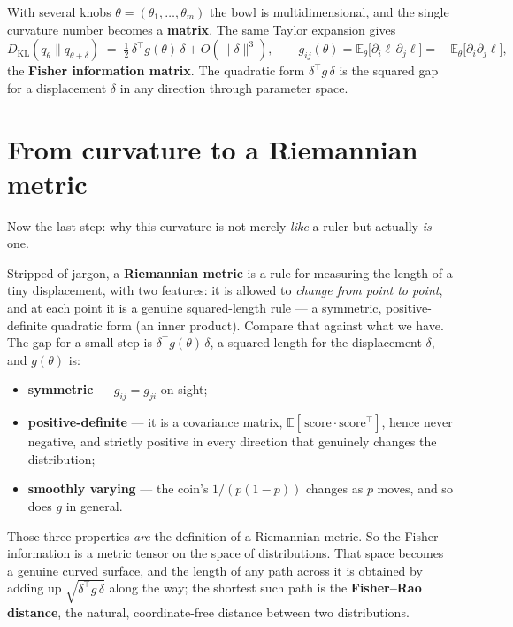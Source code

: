 \documentclass[11pt]{article}
\begin{document}
With several knobs $\theta = (\theta_1, \dots, \theta_m)$ the bowl is multidimensional, and the
single curvature number becomes a \textbf{matrix}. The same Taylor expansion gives
\[
  D_{\mathrm{KL}}(q_\theta \| q_{\theta+\delta}) \;=\; \tfrac12\,\delta^{\top} g(\theta)\,\delta + O(\|\delta\|^3),
  \qquad
  g_{ij}(\theta) = \mathbb{E}_\theta\big[\partial_i\ell\,\partial_j\ell\big] = -\,\mathbb{E}_\theta\big[\partial_i\partial_j\ell\big],
\]
the \textbf{Fisher information matrix}. The quadratic form $\delta^{\top} g\,\delta$ is the
squared gap for a displacement $\delta$ in any direction through parameter space.

\section{From curvature to a Riemannian metric}

Now the last step: why this curvature is not merely \emph{like} a ruler but actually \emph{is}
one.

Stripped of jargon, a \textbf{Riemannian metric} is a rule for measuring the length of a tiny
displacement, with two features: it is allowed to \emph{change from point to point}, and at each
point it is a genuine squared-length rule --- a symmetric, positive-definite quadratic form (an
inner product). Compare that against what we have. The gap for a small step is
$\delta^{\top} g(\theta)\,\delta$, a squared length for the displacement $\delta$, and $g(\theta)$
is:
\begin{itemize}[leftmargin=1.4em]
  \item \textbf{symmetric} --- $g_{ij} = g_{ji}$ on sight;
  \item \textbf{positive-definite} --- it is a covariance matrix,
  $\mathbb{E}[\,\text{score}\cdot\text{score}^{\top}]$, hence never negative, and strictly
  positive in every direction that genuinely changes the distribution;
  \item \textbf{smoothly varying} --- the coin's $1/\!\left(p(1-p)\right)$ changes as $p$ moves,
  and so does $g$ in general.
\end{itemize}
Those three properties \emph{are} the definition of a Riemannian metric. So the Fisher
information is a metric tensor on the space of distributions. That space becomes a genuine curved
surface, and the length of any path across it is obtained by adding up $\sqrt{\delta^{\top} g\,\delta}$
along the way; the shortest such path is the \textbf{Fisher--Rao distance}, the natural,
coordinate-free distance between two distributions.
\end{document}

